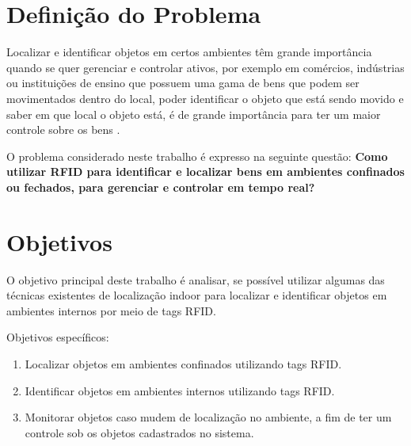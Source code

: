 \section{Definição do Problema}

Localizar e identificar objetos em certos ambientes têm grande importância quando se quer gerenciar e controlar ativos, por exemplo em comércios, indústrias ou instituições de ensino que possuem uma gama de bens que podem ser movimentados dentro do local,  poder identificar o objeto que está sendo movido e saber em que local o objeto está, é de grande importância para ter um maior controle sobre os bens \cite{realtimeRFID2016}. 

\par
O problema considerado neste trabalho é expresso na seguinte questão: \textbf{ Como utilizar RFID para identificar e localizar bens em ambientes confinados ou fechados, para gerenciar e controlar em tempo real?}
\section{Objetivos}
O objetivo principal deste trabalho é analisar, se possível utilizar algumas das técnicas existentes de localização indoor para localizar e identificar objetos em ambientes internos por meio de tags RFID.
\par
Objetivos específicos:
\begin{enumerate}

    \item Localizar objetos em ambientes confinados utilizando tags RFID.
    
    \item Identificar objetos em ambientes internos utilizando tags RFID.
    
    \item Monitorar objetos caso mudem de localização no ambiente, a fim de ter um controle sob os objetos cadastrados no sistema.
    
\end{enumerate}


